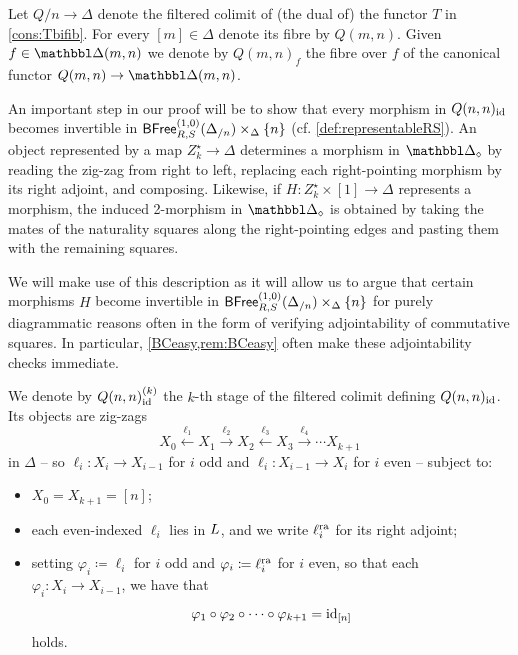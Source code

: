 \documentclass[a4paper,reqno,twoside]{amsart}
\begin{document}
\begin{notation}\label{not:Qnninfty}
	Let $Q/n \to \Delta$ denote the filtered colimit of (the dual of) the functor $T$ in \cref{cons:Tbifib}. For every $[m]\in \Delta$ denote its fibre by $Q(m,n)$. Given $f \in \ddelta(m,n)$ we denote by $Q(m,n)_f$ the fibre over $f$ of the canonical functor $Q(m,n) \to \ddelta(m,n)$.
\end{notation}

\begin{remark}\label{rem:univadjointable}
	An important step in our proof will be to show that every morphism in $Q(n,n)_{\mathrm{id}}$ becomes invertible in $\mathsf{BFree}^{(1,0)}_{R,S}(\Delta_{/n})\times_\Delta\{n\}$ (cf. \cref{def:representableRS}). An object represented by a map $Z_k^\star\to\Delta$ determines a morphism in $\ddelta_\diamond$ by reading the zig-zag from right to left, replacing each right-pointing morphism by its right adjoint, and composing. Likewise, if $H\colon Z_k^\star\times[1]\to\Delta$ represents a morphism, the induced 2-morphism in $\ddelta_\diamond$ is obtained by taking the mates of the naturality squares along the right-pointing edges and pasting them with the remaining squares.

	We will make use of this description as it will allow us to argue that certain morphisms $H$ become invertible in $\mathsf{BFree}^{(1,0)}_{R,S}(\Delta_{/n})\times_\Delta\{n\}$ for purely diagrammatic reasons often in the form of verifying adjointability of commutative squares.  In particular, \cref{BCeasy,rem:BCeasy} often make these adjointability checks immediate. 
\end{remark}

\begin{notation}\label{not:Qnn}
	We denote by $Q(n,n)^{(k)}_{\mathrm{id}}$ the $k$-th stage of the filtered colimit defining $Q(n,n)_{\mathrm{id}}$. Its objects are zig-zags
	\[
		X_0 \xleftarrow{\ \ell_1\ } X_1 \xrightarrow{\ \ell_2\ } X_2
		\xleftarrow{\ \ell_3\ } X_3 \xrightarrow{\ \ell_4\ } \cdots X_{k+1}
	\]
	in $\Delta$ -- so $\ell_i \colon X_i \to X_{i-1}$ for $i$ odd and $\ell_i \colon X_{i-1} \to X_i$ for $i$ even -- subject to:
	\begin{itemize}
		\item $X_0=X_{k+1}=[n]$;
		\item each even-indexed $\ell_i$ lies in $\relax{L}$, and we write $\ell_{i}^{\mathrm{ra}}$ for its right adjoint;
		\item setting $\varphi_i \coloneqq \ell_i$ for $i$ odd and $\varphi_i \coloneqq \ell_i^{\mathrm{ra}}$ for $i$ even, so that each $\varphi_i \colon X_i \to X_{i-1}$, we have that 
		\[
			\varphi_1 \circ \varphi_2 \circ \cdots \circ \varphi_{k+1}=\mathrm{id}_{[n]}
		\]
		holds.
	\end{itemize}
\end{notation}
\end{document}

